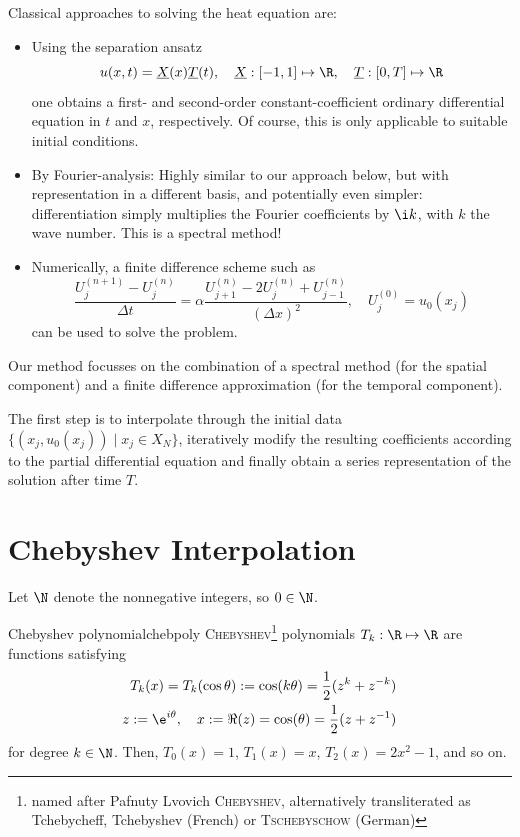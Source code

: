 \documentclass[12pt, a4paper]{article}
\newcommand{\chebyshev}{\textsc{Chebyshev}\xspace}
\begin{document}
  Classical approaches to solving the heat equation are:
  \begin{itemize}
    \item Using the separation ansatz
          $$u(x, t) = \underline{X}(x) \underline{T}(t), \quad \underline{X}: [-1, 1] \mapsto \R, \quad \underline{T}: [0, T] \mapsto \R$$
          one obtains a first- and second-order constant-coefficient ordinary differential equation in $t$ and $x$, respectively. Of course, this is only applicable to suitable initial conditions.

    \item By Fourier-analysis: Highly similar to our approach below, but with representation in a different basis, and potentially even simpler: differentiation simply multiplies the Fourier coefficients by $\i k$, with $k$ the wave number. This is a spectral method!

    \item Numerically, a finite difference scheme such as
          $$\frac{U_{j}^{(n+1)} - U_{j}^{(n)}}{\Delta t} = \alpha \frac{U_{j+1}^{(n)} - 2 U_{j}^{(n)} + U_{j-1}^{(n)}}{(\Delta x)^2}, \quad U_j^{(0)} = u_0(x_j)$$ can be used to solve the problem.
  \end{itemize}

  Our method focusses on the combination of a spectral method (for the spatial component) and a finite difference approximation (for the temporal component).

  The first step is to interpolate through the initial data $\{(x_j, u_0(x_j)) \;|\; x_j \in X_N\}$, iteratively modify the resulting coefficients according to the partial differential equation and finally obtain a series representation of the solution after time $T$.

  \pagebreak
  \section{Chebyshev Interpolation}
  Let $\N$ denote the nonnegative integers, so $0 \in \N$.

  \begin{definition}{Chebyshev polynomial}{chebpoly}
    \chebyshev\footnote{named after Pafnuty Lvovich \chebyshev, alternatively transliterated as Tchebycheff, Tchebyshev (French) or \textsc{Tschebyschow} (German)} polynomials $T_k: \R \mapsto \R$ are functions satisfying
    \begin{align*}
      T_k(x) = T_k(\cos \theta) := \cos(k \theta) = \frac{1}{2} (z^k + z^{-k}) \\
      z := \e^{i \theta},\quad x := \Re(z) = \cos(\theta) = \frac{1}{2}(z + z^{-1})
    \end{align*}
    for degree $k \in \N$. Then, $T_0(x) = 1$, $T_1(x) = x$, $T_2(x) = 2x^2-1$, and so on.
  \end{definition}
\end{document}
